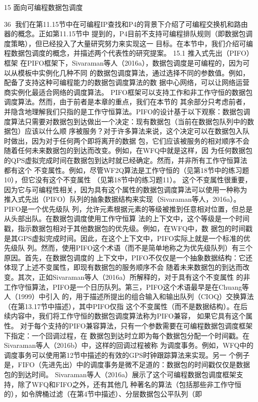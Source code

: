 15 面向可编程数据包调度

                                                                 36
我们在第11.15节中在可编程IP查找和P4的背景下介绍了可编程交换机和路由器的概念。正如第11.15节中
提到的，P4目前不支持可编程排队规则（即数据包调度策略），但已经投入了大量研究努力来实现这一
目标。在本节中，我们介绍可编程数据包调度的概念，并描述两个代表性的研究提案。
15.1 推入式先出（PIFO）框架
在PIFO框架下，Sivaraman等人（2016a），数据包调度是可编程的，因为可以从模板中实例化几种不同
的数据包调度算法，通过选择不同的参数值。例如，配备了支持这种可编程能力的数据包调度算法的数
据中心网络，可以让网络运营商实例化最适合网络的调度算法。
PIFO框架可以支持工作和非工作守恒的数据包调度算法。然而，由于前者是本章的重点，我们在本节的
其余部分只考虑前者，并隐含地理解我们只指的是工作守恒算法。PIFO的设计基于以下观察：数据包调
度算法只需要对数据包到达做出一个决定：现有数据包（当前在数据包队列中的数据包）应该以什么顺
序被服务？对于许多算法来说，这个决定可以在数据包入队时做出，因为对于任何两个即将离开的数据
包，它们应该被服务的相对顺序不会随着任何未来数据包的到达而改变。例如，在WFQ中就是这样，因
为任何数据包的QPS虚拟完成时间在数据包到达时就已经确定。然而，并非所有工作守恒算法都有这个
不变属性。例如，尽管WF2Q算法是工作守恒的（见第18节中的练习题10），但它没有这个不变属性
（见第18节中的练习题11）。
这个不变属性很重要，因为它与可编程性相关，因为具有这个属性的数据包调度算法可以使用一种称为
推入式先出（PIFO）队列的抽象数据结构来实现（Sivaraman等人，2016a）。PIFO是一个优先级队
列，允许元素根据元素的等级被推到任意相对位置，但总是从头部出队。在数据包调度使用工作守恒算
法的上下文中，这个等级是一个时间戳，指示数据包相对于其他数据包的优先级。例如，在WFQ中，数
据包的时间戳是其GPS虚拟完成时间。因此，在这个上下文中，PIFO实际上就是一个标准的优先级队
列。然而，使用PIFO这个术语（而不是简单地称之为优先级队列）有三个原因。首先，在数据包调度的
上下文中，PIFO不仅仅是一个抽象数据结构：它还体现了上述不变属性，即现有数据包的服务顺序不会
随着未来数据包的到达而改变。其次，正如Sivaraman等人（2016a）所解释的，对于具有这个不变属性
的非工作守恒算法，PIFO是一个日历队列。第三，PIFO这个术语最早是在Chuang等人（1999）中引入
的，用于描述所提出的组合输入和输出队列（CIOQ）交换算法（在第13.17节中描述），其中PIFO仅指
这个不变属性（而不是数据结构）。在后续内容中，我们将工作守恒的数据包调度算法称为PIFO兼容，
如果它具有这个属性。
对于每个支持的PIFO兼容算法，只有一个参数需要在可编程数据包调度框架下指定：一个回调过程，在
数据包到达时立即为每个数据包分配一个时间戳。在Sivaraman等人（2016b）中，这样的回调过程被称
为调度事务。例如，WFQ中的调度事务可以使用第12节中描述的有效的GPS时钟跟踪算法来实现。另一
个例子是，FIFO（先进先出）中的调度事务是微不足道的：数据包的时间戳仅仅是数据包的到达时间。
Sivaraman等人（2016a）展示了这个可编程数据包调度框架支持，除了WFQ和FIFO之外，还有其他几
种著名的算法（包括那些非工作守恒的），如令牌桶过滤（在第4节中描述）、分层数据包公平队列（即


